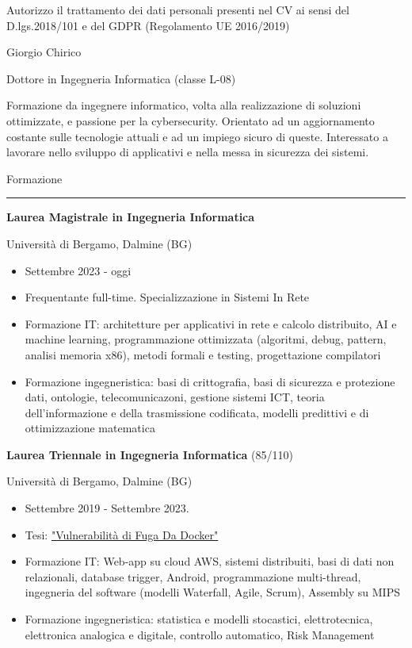 \documentclass[a4paper]{letter}
\begin{document}
\hfill
\begin{minipage}[t]{0.65\textwidth}
\setlength{\baselineskip}{1.4\baselineskip}

{\tiny Autorizzo il trattamento dei dati personali presenti nel CV ai sensi del D.lgs.2018/101 e del GDPR (Regolamento UE 2016/2019)}
\vspace{0.3cm}


{\huge Giorgio Chirico}

{\large Dottore in Ingegneria Informatica (classe L-08)}

\vspace{0.5cm}
 
Formazione da ingegnere informatico, volta alla realizzazione di soluzioni ottimizzate, e passione per la cybersecurity. Orientato ad un aggiornamento costante sulle tecnologie attuali e ad un impiego sicuro di queste. Interessato a lavorare nello sviluppo di applicativi e nella messa in sicurezza dei sistemi.

\vspace{0.5cm}

{\large Formazione}
\rule{\linewidth}{0.4pt}

{\large \textbf{Laurea Magistrale in Ingegneria Informatica}}

{\small Università di Bergamo, Dalmine (BG)}
\begin{itemize}
    \item Settembre 2023 - oggi
    \item Frequentante full-time. Specializzazione in Sistemi In Rete
    \item Formazione IT: architetture per applicativi in rete e calcolo distribuito, AI e machine learning, programmazione ottimizzata (algoritmi, debug, pattern, analisi memoria x86), metodi formali e testing, progettazione compilatori
    \item Formazione ingegneristica: basi di crittografia, basi di sicurezza e protezione dati, ontologie, telecomunicazoni, gestione sistemi ICT, teoria dell'informazione e della trasmissione codificata, modelli predittivi e di ottimizzazione matematica
\end{itemize}

{\large \textbf{Laurea Triennale in Ingegneria Informatica} \small (85/110)}

{\small Università di Bergamo, Dalmine (BG)}
\begin{itemize}
    \item Settembre 2019 - Settembre 2023.
    \item Tesi: \href{https://github.com/giorgio-hash/tesi-triennio}{"Vulnerabilità di Fuga Da Docker"}
    \item Formazione IT: Web-app su cloud AWS, sistemi distribuiti, basi di dati non relazionali, database trigger, Android, programmazione multi-thread, ingegneria del software (modelli Waterfall, Agile, Scrum), Assembly su MIPS
    \item Formazione ingegneristica: statistica e modelli stocastici, elettrotecnica, elettronica analogica e digitale, controllo automatico, Risk Management
\end{itemize}


\end{minipage}
\end{document}
